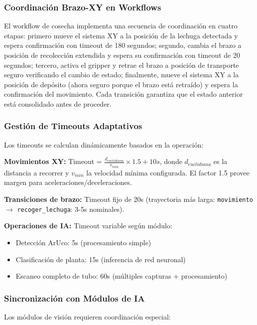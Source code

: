 \subsubsection{Coordinación Brazo-XY en Workflows}

El workflow de cosecha implementa una secuencia de coordinación en cuatro etapas: primero mueve el sistema XY a la posición de la lechuga detectada y espera confirmación con timeout de 180 segundos; segundo, cambia el brazo a posición de recolección extendida y espera su confirmación con timeout de 20 segundos; tercero, activa el gripper y retrae el brazo a posición de transporte seguro verificando el cambio de estado; finalmente, mueve el sistema XY a la posición de depósito (ahora seguro porque el brazo está retraído) y espera la confirmación del movimiento. Cada transición garantiza que el estado anterior está consolidado antes de proceder.

\subsubsection{Gestión de Timeouts Adaptativos}

Los timeouts se calculan dinámicamente basados en la operación:

\textbf{Movimientos XY:} Timeout = $\frac{d_{euclidiana}}{v_{min}} \times 1.5 + 10s$, donde $d_{euclidiana}$ es la distancia a recorrer y $v_{min}$ la velocidad mínima configurada. El factor 1.5 provee margen para aceleraciones/deceleraciones.

\textbf{Transiciones de brazo:} Timeout fijo de 20s (trayectoria más larga: \texttt{movimiento} $\rightarrow$ \texttt{recoger\_lechuga}: 3-5s nominales).

\textbf{Operaciones de IA:} Timeout variable según módulo:
\begin{itemize}[label=$\bullet$]
    \item Detección ArUco: 5s (procesamiento simple)
    \item Clasificación de planta: 15s (inferencia de red neuronal)
    \item Escaneo completo de tubo: 60s (múltiples capturas + procesamiento)
\end{itemize}

\subsubsection{Sincronización con Módulos de IA}

Los módulos de visión requieren coordinación especial:

